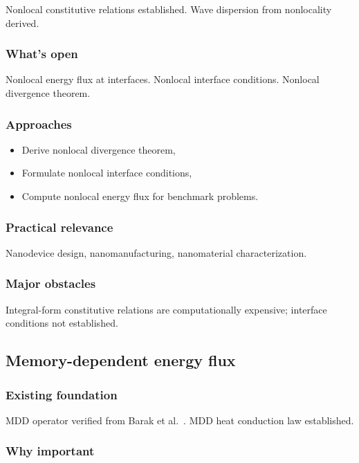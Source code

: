Nonlocal constitutive relations established. Wave dispersion from nonlocality derived.

\subsubsection{What's open}

Nonlocal energy flux at interfaces. Nonlocal interface conditions. Nonlocal divergence theorem.

\subsubsection{Approaches}

\begin{itemize}
\item Derive nonlocal divergence theorem,
\item Formulate nonlocal interface conditions,
\item Compute nonlocal energy flux for benchmark problems.
\end{itemize}

\subsubsection{Practical relevance}

Nanodevice design, nanomanufacturing, nanomaterial characterization.

\subsubsection{Major obstacles}

Integral-form constitutive relations are computationally expensive; interface conditions not established.

\subsection{Memory-dependent energy flux}
\label{sec:15.7}

\subsubsection{Existing foundation}

MDD operator verified from Barak et al.~\cite{Barak2023}. MDD heat conduction law established.

\subsubsection{Why important}

